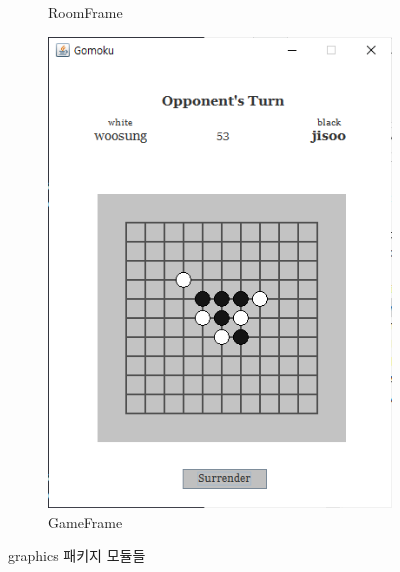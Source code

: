 \documentclass[a4paper, 10pt]{article}
\begin{document}
\begin{figure}[h]
\begin{subfigure}{.24\textwidth}
    \caption{RoomFrame}
    \label{fig:room_frame}
  \end{subfigure}
  \begin{subfigure}{.24\textwidth}
    \centering
    \includegraphics[width=.9\linewidth]{resource/game}
    \caption{GameFrame}
    \label{fig:game_frame}
  \end{subfigure}
  \caption{graphics 패키지 모듈들}
\end{figure}
\end{document}

